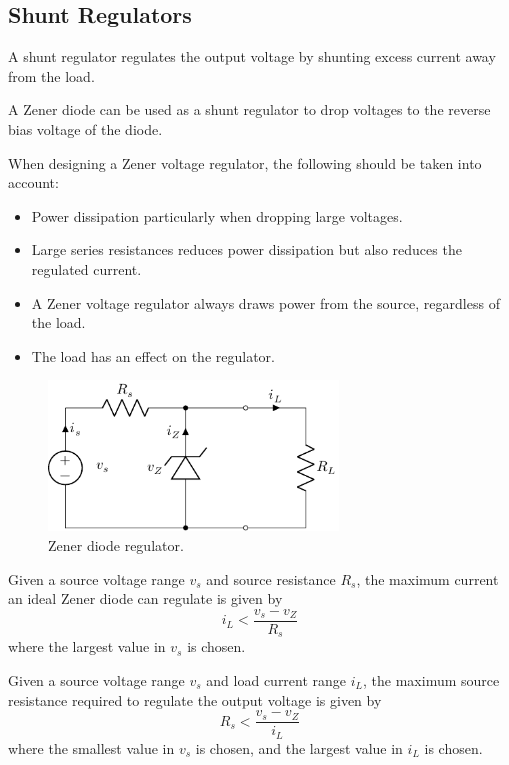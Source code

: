 \documentclass{article}
\begin{document}
\subsection{Shunt Regulators}
\begin{definition}
    A shunt regulator regulates the output voltage by shunting excess current away from the load.
\end{definition}
A Zener diode can be used as a shunt regulator to drop voltages to the reverse bias voltage of the diode.
\begin{remark}
    When designing a Zener voltage regulator, the following should be taken into account:
    \begin{itemize}
        \item Power dissipation particularly when dropping large voltages.
        \item Large series resistances reduces power dissipation but also reduces the regulated current.
        \item A Zener voltage regulator always draws power from the source, regardless of the load.
        \item The load has an effect on the regulator.
    \end{itemize}
\end{remark}
\begin{figure}[H]
    \centering
    \includegraphics[height = 4cm, keepaspectratio = true]{figures/zener_regulator.pdf}
    \caption{Zener diode regulator.}
\end{figure}
\begin{theorem}
    Given a source voltage range \(v_s\) and source resistance \(R_s\), the maximum current an ideal
    Zener diode can regulate is given by
    \begin{equation*}
        i_L < \frac{v_s - v_Z}{R_s}
    \end{equation*}
    where the largest value in \(v_s\) is chosen.
\end{theorem}
\begin{theorem}
    Given a source voltage range \(v_s\) and load current range \(i_L\), the maximum source resistance required
    to regulate the output voltage is given by
    \begin{equation*}
        R_s < \frac{v_s - v_Z}{i_L}
    \end{equation*}
    where the smallest value in \(v_s\) is chosen, and the largest value in \(i_L\) is chosen.
\end{theorem}
\end{document}
